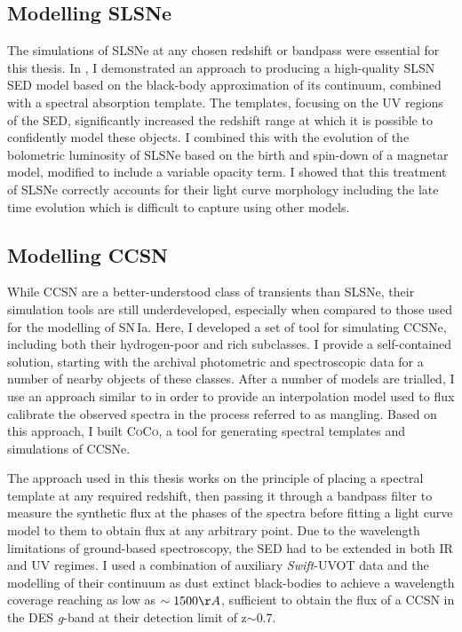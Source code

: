 \subsection{Modelling SLSNe}
The simulations of SLSNe at any chosen redshift or bandpass were essential for this thesis. In , I demonstrated an approach to producing a high-quality SLSN SED model based on the black-body approximation of its continuum, combined with a spectral absorption template. The templates, focusing on the UV regions of the SED, significantly increased the redshift range at which it is possible to confidently model these objects. I combined this with the evolution of the bolometric luminosity of SLSNe based on the birth and spin-down of a magnetar model, modified to include a variable opacity term. I showed that this treatment of SLSNe correctly accounts for their light curve morphology including the late time evolution which is difficult to capture using other models.

\subsection{Modelling CCSN}
While CCSN are a better-understood class of transients than SLSNe, their simulation tools are still underdeveloped, especially when compared to those used for the modelling of SN\,Ia. Here, I developed a set of tool for simulating CCSNe, including both their hydrogen-poor and rich subclasses. I provide a self-contained solution, starting with the archival photometric and spectroscopic data for a number of nearby objects of these classes. After a number of models are trialled, I use an approach similar to \citet{Bazin2009} in order to provide an interpolation model used to flux calibrate the observed spectra in the process referred to as mangling. Based on this approach, I built \textsc{CoCo}, a tool for generating spectral templates and simulations of CCSNe.

The approach used in this thesis works on the principle of placing a spectral template at any required redshift, then passing it through a bandpass filter to measure the synthetic flux at the phases of the spectra before fitting a light curve model to them to obtain flux at any arbitrary point. Due to the wavelength limitations of ground-based spectroscopy, the SED had to be extended in both IR and UV regimes. I used a combination of auxiliary \textit{Swift}-UVOT data and the modelling of their continuum as dust extinct black-bodies to achieve a wavelength coverage reaching as low as $\sim1500\AA$, sufficient to obtain the flux of a CCSN in the DES \textit{g}-band at their detection limit of z$\sim$0.7.

